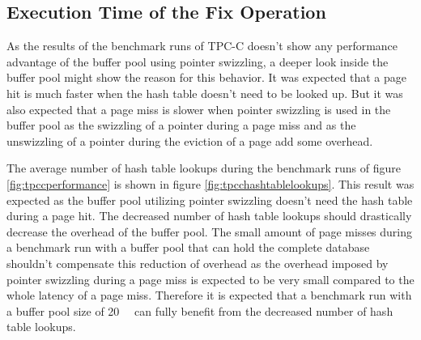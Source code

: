 \subsection{Execution Time of the Fix Operation}

    As the results of the benchmark runs of TPC-C doesn't show any performance advantage of the buffer pool using pointer swizzling, a deeper look inside the buffer pool might show the reason for this behavior. It was expected that a page hit is much faster when the hash table doesn't need to be looked up. But it was also expected that a page miss is slower when pointer swizzling is used in the buffer pool as the swizzling of a pointer during a page miss and as the unswizzling of a pointer during the eviction of a page add some overhead.

    The average number of hash table lookups during the benchmark runs of figure \ref{fig:tpccperformance} is shown in figure \ref{fig:tpcchashtablelookups}. This result was expected as the buffer pool utilizing pointer swizzling doesn't need the hash table during a page hit. The decreased number of hash table lookups should drastically decrease the overhead  of the buffer pool. The small amount of page misses during a benchmark run with a buffer pool that can hold the complete database shouldn't compensate this reduction of overhead as the overhead imposed by pointer swizzling during a page miss is expected to be very small compared to the whole latency of a page miss. Therefore it is expected that a benchmark run with a buffer pool size of \SI{20}{\gibi\byte} can fully benefit from the decreased number of hash table lookups.

